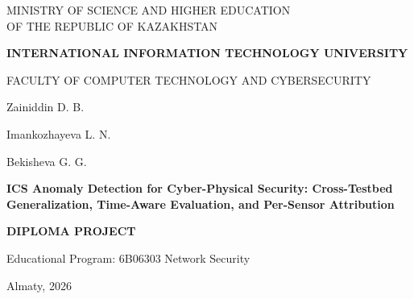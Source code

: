 \thispagestyle{empty}
\setcounter{page}{0}

\begin{center}
{\fontsize{14pt}{18pt}\selectfont MINISTRY OF SCIENCE AND HIGHER EDUCATION\\ OF THE REPUBLIC OF KAZAKHSTAN\par}
\vspace{0.4cm}
{\fontsize{14pt}{18pt}\selectfont \textbf{INTERNATIONAL INFORMATION TECHNOLOGY UNIVERSITY}\par}
\vspace{0.3cm}
{\fontsize{14pt}{18pt}\selectfont FACULTY OF COMPUTER TECHNOLOGY AND CYBERSECURITY\par}

\vspace{4cm}

{\fontsize{14pt}{18pt}\selectfont Zainiddin D. B.\par}
\vspace{0.1cm}
{\fontsize{14pt}{18pt}\selectfont Imankozhayeva L. N.\par}
\vspace{0.1cm}
{\fontsize{14pt}{18pt}\selectfont Bekisheva G. G.\par}

\vspace{2cm}

{\fontsize{16pt}{20pt}\selectfont \textbf{ICS Anomaly Detection for Cyber-Physical Security: Cross-Testbed Generalization, Time-Aware Evaluation, and Per-Sensor Attribution}\par}

\vspace{1.5cm}

{\fontsize{14pt}{18pt}\selectfont \textbf{DIPLOMA PROJECT}\par}

\vspace{1cm}

{\fontsize{14pt}{18pt}\selectfont Educational Program: 6B06303 Network Security\par}

\vfill

{\fontsize{14pt}{18pt}\selectfont Almaty, 2026\par}
\end{center}

\newpage
